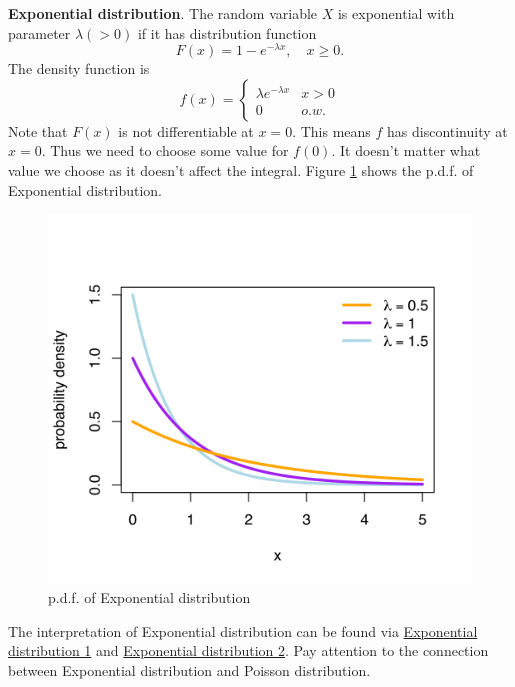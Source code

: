 \begin{example}
\textbf{Exponential distribution}. The random variable $X$ is exponential with parameter $\lambda(> 0)$ if it has distribution function 
\begin{equation*}
    F(x) = 1 - e^{-\lambda x}, \quad x \geq 0.
\end{equation*}
The density function is
\begin{equation*}
    f(x) = \begin{cases} \lambda e^{-\lambda x} & x > 0 \\ 0 & o.w.
    \end{cases}
\end{equation*}
Note that $F(x)$ is not differentiable at $x=0$. This means $f$ has discontinuity at $x=0$. Thus we need to choose some value for $f(0)$. It doesn't matter what value we choose as it doesn't affect the integral. Figure \ref{fig:exponential} shows the p.d.f. of Exponential distribution.
\begin{figure}[!htb]
    \centering
    \includegraphics[scale=0.25]{plots/exponential.png}
    \caption{p.d.f. of Exponential distribution}
    \label{fig:exponential}
\end{figure}

\begin{remark}
The interpretation of Exponential distribution can be found via \href{https://www.probabilitycourse.com/chapter4/4_2_2_exponential.php}{Exponential distribution 1} and \href{https://www.statlect.com/probability-distributions/exponential-distribution}{Exponential distribution 2}. Pay attention to the connection between Exponential distribution and Poisson distribution.
\end{remark}
\end{example}

